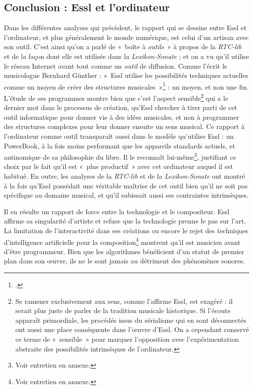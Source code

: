 \documentclass[a4paper,12pt]{article}
\newcommand{\guill}[1]{«~#1~»}
\begin{document}
\subsection{Conclusion : Essl et l'ordinateur}

Dans les différentes analyses qui précèdent, le rapport qui se dessine entre Essl et l'ordinateur, et plus généralement le monde numérique, est celui d'un artisan avec son outil. C'est ainsi qu'on a parlé de \guill{boîte à \emph{outils}} à propos de la \emph{RTC-lib} et de la façon dont elle est utilisée dans la \emph{Lexikon-Sonate} ; et on a vu qu'il utilise le réseau Internet avant tout comme un \emph{outil} de diffusion. Comme l'écrit le musicologue Bernhard Günther : \guill{Essl utilise les possibilités techniques actuelles comme un moyen de créer des structures musicales}\footnote{\cite{irrealenzyklopadie}.} : un moyen, et non une fin. L'étude de ses programmes montre bien que c'est l'aspect sensible\footnote{Se ramener exclusivement aux sens, comme l'affirme Essl, est exagéré : il serait plus juste de parler de la tradition musicale historique. Si l'écoute apparaît primordiale, les procédés issus du sérialisme qui en sont déconnectés ont aussi une place conséquente dans l'œuvre d'Essl. On a cependant conservé ce terme de \guill{sensible} pour marquer l'opposition avec l'expérimentation abstraite des possibilités intrinsèques de l'ordinateur.} qui a le dernier mot dans le processus de création, qu'Essl chercher à tirer parti de cet outil informatique pour donner vie à des idées musicales, et non à programmer des structures complexes pour leur donner ensuite un sens musical. Ce rapport à l'ordinateur comme outil transparaît aussi dans le modèle qu'utilise Essl : un PowerBook, à la fois moins performant que les appareils standards actuels, et antinomique de sa philosophie du libre. Il le reconnaît lui-même\footnote{Voir entretien en annexe.}, justifiant ce choix par le fait qu'il est \guill{plus productif} avec cet ordinateur auquel il est habitué. En outre, les analyses de la \emph{RTC-lib} et de la \emph{Lexikon-Sonate} ont montré à la fois qu'Essl possédait une véritable maîtrise de cet outil bien qu'il ne soit pas spécifique au domaine musical, et qu'il subissait aussi ses contraintes intrinsèques.

Il en résulte un rapport de force entre la technologie et le compositeur. Essl affirme sa singularité d'artiste et refuse que la technologie prenne le pas sur l'art. La limitation de l'interactivité dans ses créations ou encore le rejet des techniques d'intelligence artificielle pour la composition\footnote{Voir entretien en annexe.} montrent qu'il est musicien avant d'être programmeur. Bien que les algorithmes bénéficient d'un statut de premier plan dans son œuvre, ils ne le sont jamais au détriment des phénomènes sonores.
\end{document}
